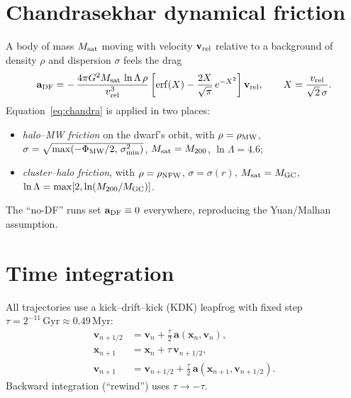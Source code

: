 \documentclass[11pt]{article}
\newcommand{\Gyr}{\,\mathrm{Gyr}}
\begin{document}
\section{Chandrasekhar dynamical friction}
A body of mass $M_{\rm sat}$ moving with velocity $\mathbf{v}_{\rm rel}$
relative to a background of density $\rho$ and dispersion $\sigma$ feels the drag
\begin{equation}
\mathbf{a}_{\rm DF}
= -\,\frac{4\pi G^2 M_{\rm sat}\,\ln\Lambda\,\rho}{v_{\rm rel}^3}
\left[\operatorname{erf}(X)-\frac{2X}{\sqrt\pi}\,e^{-X^2}\right]\mathbf{v}_{\rm rel},
\qquad
X=\frac{v_{\rm rel}}{\sqrt2\,\sigma}.
\label{eq:chandra}
\end{equation}
Equation~\eqref{eq:chandra} is applied in two places:
\begin{itemize}
\item \emph{halo--MW friction} on the dwarf's orbit, with $\rho=\rho_{\rm MW}$,
$\sigma=\sqrt{\max(-\Phi_{\rm MW}/2,\,\sigma_{\min}^2)}$, $M_{\rm sat}=M_{200}$,
$\ln\Lambda=4.6$;
\item \emph{cluster--halo friction}, with $\rho=\rho_{\rm NFW}$,
$\sigma=\sigma(r)$, $M_{\rm sat}=M_{\rm GC}$,
$\ln\Lambda=\max[2,\ln(M_{200}/M_{\rm GC})]$.
\end{itemize}
The ``no-DF'' runs set $\mathbf{a}_{\rm DF}\equiv 0$ everywhere, reproducing the
Yuan/Malhan assumption.

\section{Time integration}
All trajectories use a kick--drift--kick (KDK) leapfrog with fixed step
$\tau=2^{-11}\Gyr\approx0.49\,\mathrm{Myr}$:
\begin{align}
\mathbf{v}_{n+1/2}&=\mathbf{v}_n+\tfrac{\tau}{2}\,\mathbf{a}(\mathbf{x}_n,\mathbf{v}_n),\nonumber\\
\mathbf{x}_{n+1}&=\mathbf{x}_n+\tau\,\mathbf{v}_{n+1/2},\\
\mathbf{v}_{n+1}&=\mathbf{v}_{n+1/2}+\tfrac{\tau}{2}\,\mathbf{a}(\mathbf{x}_{n+1},\mathbf{v}_{n+1/2}).\nonumber
\end{align}
Backward integration (``rewind'') uses $\tau\to-\tau$.
\end{document}

